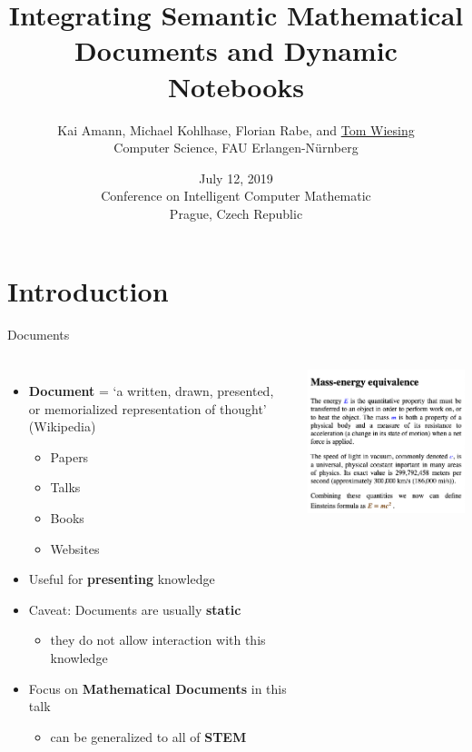 \documentclass{beamer}
\title[Semantic Documents and Dynamic Notebooks]{Integrating Semantic Mathematical Documents and Dynamic Notebooks}
\author[Tom Wiesing et al.]{Kai Amann, Michael Kohlhase, Florian Rabe, and \underline{Tom Wiesing}\\Computer Science, FAU Erlangen-N{\"u}rnberg}
\date[July 12 2019, CICM Prague]{July 12, 2019\\Conference on Intelligent Computer Mathematic\\Prague, Czech Republic}
\begin{document}
    \frame{\titlepage}
    
    \section{Introduction}

    \begin{frame}{Documents}
        \begin{columns}
            \begin{itemize}
                \item \textbf{Document} = `a written, drawn, presented, or memorialized representation of thought' (Wikipedia)
                \begin{itemize}
                    \item Papers
                    \item Talks
                    \item Books
                    \item Websites
                \end{itemize}
                \item Useful for \textbf{presenting} knowledge
                \item Caveat: Documents are usually \textbf{static}
                \begin{itemize}
                    \item they do not allow interaction with this knowledge
                \end{itemize}
                \item Focus on \textbf{Mathematical Documents} in this talk
                \begin{itemize}
                    \item can be generalized to all of \textbf{STEM}
                \end{itemize}
            \end{itemize}
            \includegraphics[scale=0.25]{images/doc}
        \end{columns}
    \end{frame}
\end{document}
